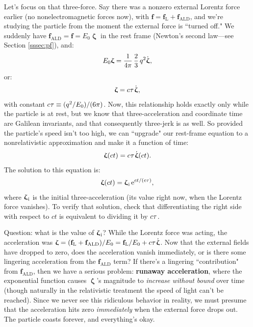 \documentclass[12pt]{article}
\renewcommand{\vv}[1]{\mathbf{#1}}
\newcommand{\vvzeta}{\bm{\upzeta}}
\begin{document}
Let's focus on that three-force. Say there was a nonzero external Lorentz force earlier (no nonelectromagnetic forces now), with $\vv f = \vv f_{\textrm{L}} + \vv f_{\textrm{ALD}}$, and we're studying the particle from the moment the external force is ``turned off." We suddenly have $\vv f_{\textrm{ALD}} = \vv f = E_0 \vvzeta$ in the rest frame (Newton's second law---see Section \ref{sssec:pf}), and:
\begin{equation*}
E_0 \vvzeta = \dfrac{1}{4 \pi} \, \dfrac{2}{3} \, q^2 \dot{\vvzeta} \mkern1mu ,
\end{equation*}
or:
\begin{equation*}
\vvzeta = c \mkern.5mu \tau \mkern1.5mu \dot{\vvzeta} \mkern1mu ,
\end{equation*}
with constant $c \mkern.5mu \tau \equiv (q^2 / E_0)/(6 \pi)$. Now, this relationship holds exactly only while the particle is at rest, but we know that three-acceleration and coordinate time are Galilean invariants, and that consequently three-jerk is as well. So provided the particle's speed isn't too high, we can ``upgrade" our rest-frame equation to a nonrelativistic approximation and make it a function of time:
\begin{equation*}
\vvzeta (ct) = c \mkern.5mu \tau \mkern1.5mu \dot{\vvzeta} (ct).
\end{equation*}
The solution to this equation is:
\begin{equation*}
\vvzeta (ct) = \vvzeta_{\mkern1mu \textrm{i}} \, \textrm{e}^{ct / (c \tau)} ,
\end{equation*}
where $\vvzeta_{\mkern1mu \textrm{i}}$ is the initial three-acceleration (its value right now, when the Lorentz force vanishes). To verify that solution, check that differentiating the right side with respect to $ct$ is equivalent to dividing it by $c \mkern.5mu \tau$.

Question: what is the value of $\vvzeta_{\mkern1mu \textrm{i}}$? While the Lorentz force was acting, the acceleration was $\vvzeta = (\vv f_{\textrm{L}} + \vv f_{\textrm{ALD}}) / E_0 = \vv f_{\textrm{L}} / E_0 + c \mkern.5mu \tau \mkern1.5mu \dot{\vvzeta}$. Now that the external fields have dropped to zero, does the acceleration vanish immediately, or is there some lingering acceleration from the $\vv f_{\textrm{ALD}}$ term? If there's a lingering ``contribution" from $\vv f_{\textrm{ALD}}$, then we have a serious problem: \textbf{runaway acceleration}, where the exponential function causes $\vvzeta$'s magnitude to \emph{increase without bound} over time (though naturally in the relativistic treatment the speed of light can't be reached). Since we never see this ridiculous behavior in reality, we must presume that the acceleration hits zero \emph{immediately} when the external force drops out. The particle coasts forever, and everything's okay.
\end{document}
